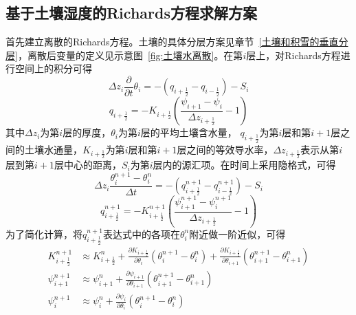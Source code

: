 \subsection{基于土壤湿度的Richards方程求解方案}

首先建立离散的Richards方程。土壤的具体分层方案见章节~\ref{土壤和积雪的垂直分层}，离散后变量的定义见示意图~\ref{fig:土壤水离散}。在第$i$层上，对Richards方程进行空间上的积分可得
\begin{equation}
\Delta z_{i} \frac{\partial}{\partial t} \theta_{i}=-\left(q_{i+\frac{1}{2}}-q_{i-\frac{1}{2}}\right)-S_{i}
\end{equation}
\begin{equation}
q_{i+\frac{1}{2}}=-K_{i+\frac{1}{2}}\left(\frac{\psi_{i+1}-\psi_{i}}{\Delta z_{i+\frac{1}{2}}}-1\right)
\end{equation}
其中$\Delta {z_i}$为第$i$层的厚度，$\theta_i$为第$i$层的平均土壤含水量，
$q_{i+\frac{1}{2}}$为第$i$层和第$i+1$层之间的土壤水通量，$K_{i+\frac{1}{2}}$为第$i$层和第$i+1$层之间的等效导水率，$\Delta z_{i+\frac{1}{2}}$表示从第$i$层到第$i+1$层中心的距离，$S_i$为第$i$层内的源汇项。在时间上采用隐格式，可得
\begin{equation}
\Delta z_{i} \frac{\theta_{i}^{n+1}-\theta_{i}^{n}}{\Delta t}=-\left(q_{i+\frac{1}{2}}^{n+1}-q_{i-\frac{1}{2}}^{n+1}\right)-S_{i}
\end{equation}
\begin{equation}
q_{i+\frac{1}{2}}^{n+1}=-K_{i+\frac{1}{2}}^{n+1}\left(\frac{\psi_{i+1}^{n+1}-\psi_{i}^{n+1}}{\Delta z_{i+\frac{1}{2}}}-1\right)
\end{equation}
为了简化计算，将$q_{i+\frac{1}{2}}^{n+1}$表达式中的各项在$\theta_i^n$附近做一阶近似，可得
\begin{equation}
\begin{aligned}
K_{i+\frac{1}{2}}^{n+1} &\approx K_{i+\frac{1}{2}}^{n}+\frac{\partial K_{i+\frac{1}{2}}}
    {\partial \theta_{i}}\left(\theta_{i}^{n+1}-\theta_{i}^{n}\right)+\frac{\partial K_{i+\frac{1}{2}}}
    {\partial \theta_{i+1}}\left(\theta_{i+1}^{n+1}-\theta_{i+1}^{n}\right) \\ 
\psi_{i+1}^{n+1} &\approx \psi_{i+1}^{n}+\frac{\partial \psi_{i+1}}{\partial \theta_{i+1}}\left(\theta_{i+1}^{n+1}-\theta_{i+1}^{n}\right) \\
\psi_{i}^{n+1} &\approx \psi_{i}^{n}+\frac{\partial \psi_{i}}{\partial \theta_{i}}\left(\theta_{i}^{n+1}-\theta_{i}^{n}\right)
\end{aligned}
\end{equation}

